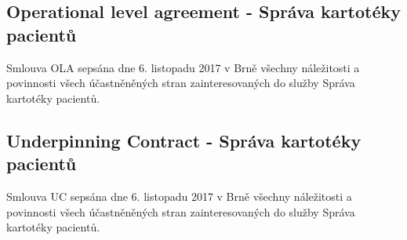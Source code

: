 \documentclass[11pt, a4paper, titlepage]{article}
\begin{document}
	\subsection{Operational level agreement - Správa kartotéky pacientů}

	Smlouva OLA sepsána dne 6. listopadu 2017 v Brně všechny náležitosti a povinnosti všech účastněněných stran zainteresovaných do služby Správa kartotéky pacientů.

	\subsection*{Underpinning Contract - Správa kartotéky pacientů}
	
	Smlouva UC sepsána dne 6. listopadu 2017 v Brně všechny náležitosti a povinnosti všech účastněněných stran zainteresovaných do služby Správa kartotéky pacientů.

	
\end{document}
